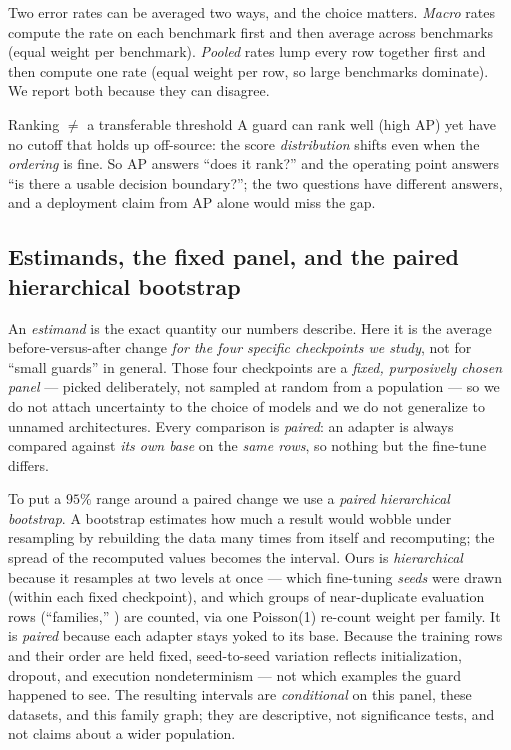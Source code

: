 Two error rates can be averaged two ways, and the choice matters. \emph{Macro} rates compute the rate
on each benchmark first and then average across benchmarks (equal weight per benchmark). \emph{Pooled}
rates lump every row together first and then compute one rate (equal weight per row, so large
benchmarks dominate). We report both because they can disagree.

\begin{takeaway}{Ranking $\neq$ a transferable threshold}
A guard can rank well (high AP) yet have no cutoff that holds up off-source: the score
\emph{distribution} shifts even when the \emph{ordering} is fine. So AP answers ``does it rank?'' and
the operating point answers ``is there a usable decision boundary?''; the two questions have different
answers, and a deployment claim from AP alone would miss the gap.
\end{takeaway}

\subsection{Estimands, the fixed panel, and the paired hierarchical bootstrap}
\label{sec:bg-estimand}

An \emph{estimand} is the exact quantity our numbers describe. Here it is the average
before-versus-after change \emph{for the four specific checkpoints we study}, not for ``small guards''
in general. Those four checkpoints are a \emph{fixed, purposively chosen panel} --- picked deliberately,
not sampled at random from a population --- so we do not attach uncertainty to the choice of models and
we do not generalize to unnamed architectures. Every comparison is \emph{paired}: an adapter is always
compared against \emph{its own base} on the \emph{same rows}, so nothing but the fine-tune differs.

To put a $95\%$ range around a paired change we use a \emph{paired hierarchical bootstrap}. A bootstrap
estimates how much a result would wobble under resampling by rebuilding the data many times from itself
and recomputing; the spread of the recomputed values becomes the interval. Ours is \emph{hierarchical}
because it resamples at two levels at once --- which fine-tuning \emph{seeds} were drawn (within each
fixed checkpoint), and which groups of near-duplicate evaluation rows (``families,''
) are counted, via one Poisson(1) re-count weight per family. It is \emph{paired}
because each adapter stays yoked to its base. Because the training rows and their order are held fixed,
seed-to-seed variation reflects initialization, dropout, and execution nondeterminism --- not
which examples the guard happened to see. The resulting intervals are \emph{conditional} on this panel,
these datasets, and this family graph; they are descriptive, not significance tests, and not claims
about a wider population.

